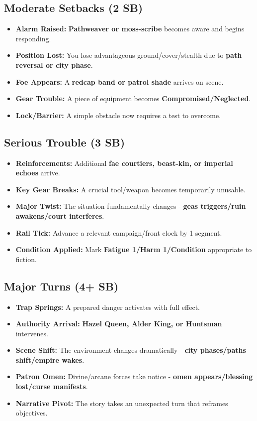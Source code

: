 \subsection*{Moderate Setbacks (2 SB)}
\begin{itemize}
\item \textbf{Alarm Raised:} \textbf{Pathweaver or moss-scribe} becomes aware and begins responding.
\item \textbf{Position Lost:} You lose advantageous ground/cover/stealth due to \textbf{path reversal or city phase}.
\item \textbf{Foe Appears:} A \textbf{redcap band or patrol shade} arrives on scene.
\item \textbf{Gear Trouble:} A piece of equipment becomes \textbf{Compromised/Neglected}.
\item \textbf{Lock/Barrier:} A simple obstacle now requires a test to overcome.
\end{itemize}

\subsection*{Serious Trouble (3 SB)}
\begin{itemize}
\item \textbf{Reinforcements:} Additional \textbf{fae courtiers, beast-kin, or imperial echoes} arrive.
\item \textbf{Key Gear Breaks:} A crucial tool/weapon becomes temporarily unusable.
\item \textbf{Major Twist:} The situation fundamentally changes - \textbf{geas triggers/ruin awakens/court interferes}.
\item \textbf{Rail Tick:} Advance a relevant campaign/front clock by 1 segment.
\item \textbf{Condition Applied:} Mark \textbf{Fatigue 1/Harm 1/Condition} appropriate to fiction.
\end{itemize}

\subsection*{Major Turns (4+ SB)}
\begin{itemize}
\item \textbf{Trap Springs:} A prepared danger activates with full effect.
\item \textbf{Authority Arrival:} \textbf{Hazel Queen, Alder King, or Huntsman} intervenes.
\item \textbf{Scene Shift:} The environment changes dramatically - \textbf{city phases/paths shift/empire wakes}.
\item \textbf{Patron Omen:} Divine/arcane forces take notice - \textbf{omen appears/blessing lost/curse manifests}.
\item \textbf{Narrative Pivot:} The story takes an unexpected turn that reframes objectives.
\end{itemize}


